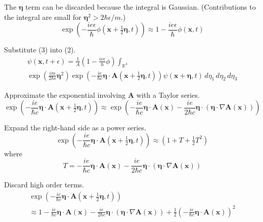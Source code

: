 \documentclass[12pt]{article}
\newcommand\INT{\int_{\mathbb R^3}}
\begin{document}
The $\boldsymbol\eta$ term can be discarded because the integral is Gaussian.
(Contributions to the integral are small for $\boldsymbol\eta^2>2\hbar\epsilon/m$.)
\begin{equation*}
\exp\left(-\frac{ie\epsilon}{\hbar}\phi\left(\mathbf x+\tfrac{1}{2}\boldsymbol\eta,t\right)\right)\approx
1-\frac{ie\epsilon}{\hbar}\phi(\mathbf x,t)
\tag{3}
\end{equation*}

Substitute (3) into (2).
\begin{multline*}
\psi(\mathbf x,t+\epsilon)=
\frac{1}{A}\left(1-\frac{ie\epsilon}{\hbar}\phi\right)\INT
\\
\exp\left(\frac{im}{2\hbar\epsilon}\boldsymbol\eta^2\right)
\exp\left(-\frac{ie}{\hbar c}\boldsymbol\eta\cdot\mathbf A\left(\mathbf x+\tfrac{1}{2}\boldsymbol\eta,t\right)\right)
\psi(\mathbf x+\boldsymbol\eta,t)
\,d\eta_1\,d\eta_2\,d\eta_3
\end{multline*}

Approximate the exponential involving $\mathbf A$ with a Taylor series.
\begin{equation*}
\exp\left(-\frac{ie}{\hbar c}\boldsymbol\eta\cdot\mathbf A\left(\mathbf x+\tfrac{1}{2}\boldsymbol\eta,t\right)\right)
\approx
\exp\left(
-\frac{ie}{\hbar c}\boldsymbol\eta\cdot\mathbf A(\mathbf x)
-\frac{ie}{2\hbar c}\boldsymbol\eta\cdot(\boldsymbol\eta\cdot\nabla\mathbf A(\mathbf x))
\right)
\end{equation*}

Expand the right-hand side as a power series.
\begin{equation*}
\exp\left(-\frac{ie}{\hbar c}\boldsymbol\eta\cdot\mathbf A\left(\mathbf x+\tfrac{1}{2}\boldsymbol\eta,t\right)\right)
\approx
\left(1+T+\tfrac{1}{2}T^2\right)
\end{equation*}
where
\begin{equation*}
T=-\frac{ie}{\hbar c}\boldsymbol\eta\cdot\mathbf A(\mathbf x)
-\frac{ie}{2\hbar c}\boldsymbol\eta\cdot(\boldsymbol\eta\cdot\nabla\mathbf A(\mathbf x))
\end{equation*}

Discard high order terms.
\begin{multline*}
\exp\left(-\frac{ie}{\hbar c}\boldsymbol\eta\cdot\mathbf A\left(\mathbf x+\tfrac{1}{2}\boldsymbol\eta,t\right)\right)
\\
\approx
1
-\frac{ie}{\hbar c}\boldsymbol\eta\cdot\mathbf A(\mathbf x)
-\frac{ie}{2\hbar c}\boldsymbol\eta\cdot(\boldsymbol\eta\cdot\nabla\mathbf A(\mathbf x))
+\frac{1}{2}\left(-\frac{ie}{\hbar c}\boldsymbol\eta\cdot\mathbf A(\mathbf x)\right)^2
\end{multline*}
\end{document}
